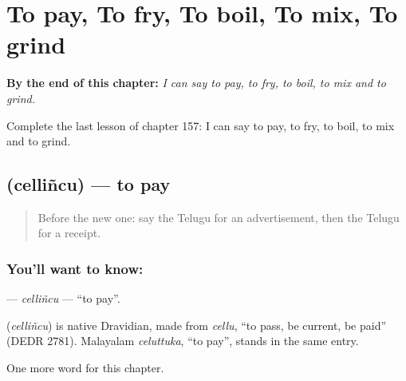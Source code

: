 
\chapter{To pay, To fry, To boil, To mix, To grind}
\label{ch:te-to-pay-to-fry-to-boil-to-mix-to-grind}

\begin{chapteropening}
\textbf{By the end of this chapter:} \emph{I can say to pay, to fry, to boil, to mix and to grind.}

Complete the last lesson of chapter 157: I can say to pay, to fry, to boil, to mix and to grind.
\end{chapteropening}

\section[\texorpdfstring{\te{చెల్లించు} (celliñcu)}{చెల్లించు (celliñcu)}]{ (celliñcu) — to pay}

\label{lesson:TE-C157-cellincu}



\begin{quote}
Before the new one: say the Telugu for an advertisement, then the Telugu for a receipt.
\end{quote}

\subsection*{You'll want to know: }
\textbf{} — \emph{celliñcu} — \textquotedblleft{}to pay\textquotedblright{}.

\begin{cousinweb}
\textbf{} (\emph{celliñcu}) is native Dravidian, made from \emph{cellu}, \textquotedblleft{}to pass, be current, be paid\textquotedblright{} (DEDR 2781). Malayalam \emph{celuttuka}, \textquotedblleft{}to pay\textquotedblright{}, stands in the same entry.
\end{cousinweb}

\begin{grammarlens}[title={What you've built}]
One more word for this chapter.
\end{grammarlens}

